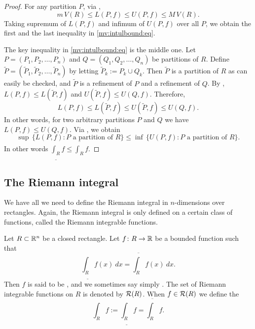 \begin{proof}
For any partition $P$, via ,
\begin{equation*}
m\,V(R) \leq L(P,f) \leq U(P,f) \leq M\,V(R).
\end{equation*}
Taking supremum of $L(P,f)$ and infimum of $U(P,f)$ over all $P$,
we obtain the first and the last inequality in
\eqref{mv:intulbound:eq}.

The key inequality in
\eqref{mv:intulbound:eq}
is the middle one.
Let $P=(P_1,P_2,\ldots,P_n)$ and
$Q=(Q_1,Q_2,\ldots,Q_n)$
be partitions of $R$.  Define 
$\widetilde{P} = ( \widetilde{P}_1,\widetilde{P}_2,\ldots,\widetilde{P}_n )$
by letting
$\widetilde{P}_k := P_k \cup Q_k$.
Then $\widetilde{P}$ is a partition of $R$ as can easily be checked,
and $\widetilde{P}$ is a refinement of $P$ and a refinement of $Q$.
By ,
$L(P,f) \leq L(\widetilde{P},f)$ and
$U(\widetilde{P},f) \leq U(Q,f)$.  Therefore,
\begin{equation*}
L(P,f) \leq L(\widetilde{P},f) \leq U(\widetilde{P},f) \leq U(Q,f) .
\end{equation*}
In other words, for two arbitrary partitions $P$ and $Q$ we have
$L(P,f) \leq U(Q,f)$.  
Via ,
we obtain
\begin{equation*}
\sup \, \bigl\{ L(P,f) : \text{$P$ a partition of $R$} \bigl\}
\leq
\inf \, \bigl\{ U(P,f) : \text{$P$ a partition of $R$} \bigl\} .
\end{equation*}
In other words $\underline{\int_R} f \leq \overline{\int_R} f$.
\end{proof}

\subsection{The Riemann integral}

We have all we need to
define the Riemann integral in $n$-dimensions over rectangles.
Again, the Riemann
integral is only defined on a certain class of functions, called the
Riemann integrable functions.

\begin{defn}
Let $R \subset {\mathbb{R}}^n$ be a closed rectangle.
Let $f \colon R \to {\mathbb{R}}$ be a bounded function such that
\begin{equation*}
\underline{\int_R} f(x)~dx = \overline{\int_R} f(x)~dx .
\end{equation*}
Then $f$ is said to be \emph{},
and we sometimes say simply \emph{}.
The set of Riemann integrable functions on $R$ is denoted
by ${\mathcal{R}}(R)$.  When $f \in {\mathcal{R}}(R)$ we define
the \emph{}
\begin{equation*}
\int_R f := 
\underline{\int_R} f = \overline{\int_R} f .
\end{equation*}
\end{defn}

